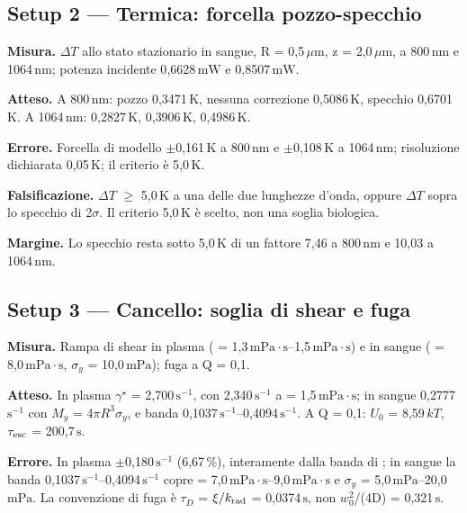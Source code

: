 \documentclass[9pt,a4paper]{article}
\begin{document}
\subsection*{Setup 2 --- Termica: forcella pozzo-specchio}
\textbf{Misura.} $\Delta T$ allo stato stazionario in sangue, R = 0{,}5\,$\mu\mathrm{m}$, z = 2{,}0\,$\mu\mathrm{m}$, a 800\,$\mathrm{nm}$ e 1064\,$\mathrm{nm}$; potenza incidente 0{,}6628\,$\mathrm{mW}$ e 0{,}8507\,$\mathrm{mW}$.

\textbf{Atteso.} A 800\,$\mathrm{nm}$: pozzo 0{,}3471\,$\mathrm{K}$, nessuna correzione 0{,}5086\,$\mathrm{K}$, specchio 0{,}6701\,$\mathrm{K}$. A 1064\,$\mathrm{nm}$: 0{,}2827\,$\mathrm{K}$, 0{,}3906\,$\mathrm{K}$, 0{,}4986\,$\mathrm{K}$.

\textbf{Errore.} Forcella di modello $\pm$0{,}161\,$\mathrm{K}$ a 800\,$\mathrm{nm}$ e $\pm$0{,}108\,$\mathrm{K}$ a 1064\,$\mathrm{nm}$; risoluzione dichiarata 0{,}05\,$\mathrm{K}$; il criterio è 5{,}0\,$\mathrm{K}$.

\textbf{Falsificazione.} $\Delta T$ $\ge$ 5{,}0\,$\mathrm{K}$ a una delle due lunghezze d'onda, oppure $\Delta T$ sopra lo specchio di 2$\sigma$. Il criterio 5{,}0\,$\mathrm{K}$ è scelto, non una soglia biologica.

\textbf{Margine.} Lo specchio resta sotto 5{,}0\,$\mathrm{K}$ di un fattore 7{,}46 a 800\,$\mathrm{nm}$ e 10{,}03 a 1064\,$\mathrm{nm}$.

\subsection*{Setup 3 --- Cancello: soglia di shear e fuga}
\textbf{Misura.} Rampa di shear in plasma (\textmu{} = 1{,}3\,$\mathrm{mPa}\cdot\mathrm{s}$--1{,}5\,$\mathrm{mPa}\cdot\mathrm{s}$) e in sangue (\textmu{} = 8{,}0\,$\mathrm{mPa}\cdot\mathrm{s}$, $\sigma_y$ = 10{,}0\,$\mathrm{mPa}$); fuga a Q = 0{,}1.

\textbf{Atteso.} In plasma $\gamma^\star$ = 2{,}700\,$\mathrm{s}^{-1}$, con 2{,}340\,$\mathrm{s}^{-1}$ a \textmu{} = 1{,}5\,$\mathrm{mPa}\cdot\mathrm{s}$; in sangue 0{,}2777\,$\mathrm{s}^{-1}$ con $M_y$ = 4$\pi R^3\sigma_y$, e banda 0{,}1037\,$\mathrm{s}^{-1}$--0{,}4094\,$\mathrm{s}^{-1}$. A Q = 0{,}1: $U_0$ = 8{,}59\,$kT$, $\tau_{\rm esc}$ = 200{,}7\,$\mathrm{s}$.

\textbf{Errore.} In plasma $\pm$0{,}180\,$\mathrm{s}^{-1}$ (6{,}67\,\%), interamente dalla banda di \textmu{}; in sangue la banda 0{,}1037\,$\mathrm{s}^{-1}$--0{,}4094\,$\mathrm{s}^{-1}$ copre \textmu{} = 7{,}0\,$\mathrm{mPa}\cdot\mathrm{s}$--9{,}0\,$\mathrm{mPa}\cdot\mathrm{s}$ e $\sigma_y$ = 5{,}0\,$\mathrm{mPa}$--20{,}0\,$\mathrm{mPa}$. La convenzione di fuga è $\tau_D$ = $\xi/k_{\rm rad}$ = 0{,}0374\,$\mathrm{s}$, non $w_0^2$/(4D) = 0{,}321\,$\mathrm{s}$.
\end{document}
